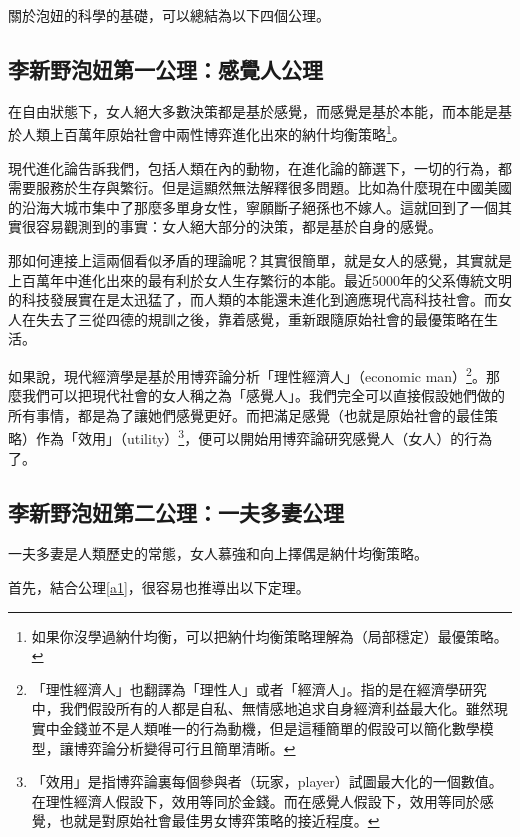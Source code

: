 關於泡妞的科學的基礎，可以總結為以下四個公理。

\subsection{李新野泡妞第一公理：感覺人公理}

\begin{axiom}\label{a1}
在自由狀態下，女人絕大多數決策都是基於感覺，而感覺是基於本能，而本能是基於人類上百萬年原始社會中兩性博弈進化出來的納什均衡策略\footnote{如果你沒學過納什均衡，可以把納什均衡策略理解為（局部穩定）最優策略。}。
\end{axiom}

現代進化論告訴我們，包括人類在內的動物，在進化論的篩選下，一切的行為，都需要服務於生存與繁衍。但是這顯然無法解釋很多問題。比如為什麼現在中國美國的沿海大城市集中了那麼多單身女性，寧願斷子絕孫也不嫁人。這就回到了一個其實很容易觀測到的事實：女人絕大部分的決策，都是基於自身的感覺。

那如何連接上這兩個看似矛盾的理論呢？其實很簡單，就是女人的感覺，其實就是上百萬年中進化出來的最有利於女人生存繁衍的本能。最近5000年的父系傳統文明的科技發展實在是太迅猛了，而人類的本能還未進化到適應現代高科技社會。而女人在失去了三從四德的規訓之後，靠着感覺，重新跟隨原始社會的最優策略在生活。

如果說，現代經濟學是基於用博弈論分析「理性經濟人」（economic man）\footnote{「理性經濟人」也翻譯為「理性人」或者「經濟人」。指的是在經濟學研究中，我們假設所有的人都是自私、無情感地追求自身經濟利益最大化。雖然現實中金錢並不是人類唯一的行為動機，但是這種簡單的假設可以簡化數學模型，讓博弈論分析變得可行且簡單清晰。}。那麼我們可以把現代社會的女人稱之為「感覺人」。我們完全可以直接假設她們做的所有事情，都是為了讓她們感覺更好。而把滿足感覺（也就是原始社會的最佳策略）作為「效用」（utility）\footnote{「效用」是指博弈論裏每個參與者（玩家，player）試圖最大化的一個數值。在理性經濟人假設下，效用等同於金錢。而在感覺人假設下，效用等同於感覺，也就是對原始社會最佳男女博弈策略的接近程度。}，便可以開始用博弈論研究感覺人（女人）的行為了。

\subsection{李新野泡妞第二公理：一夫多妻公理}

\begin{axiom}\label{a2}
一夫多妻是人類歷史的常態，女人慕強和向上擇偶是納什均衡策略。
\end{axiom}

首先，結合公理\ref{a1}，很容易也推導出以下定理。

